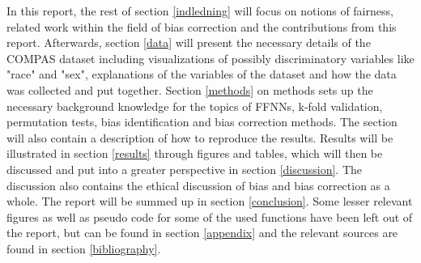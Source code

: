 \documentclass[11pt, fleqn, titlepage]{article}
\begin{document}
	\noindent In this report, the rest of section \ref{indledning} will focus on notions of fairness, related work within the field of bias correction and the contributions from this report. Afterwards, section \ref{data} will present the necessary details of the COMPAS dataset including visualizations of possibly discriminatory variables like "race" and "sex", explanations of the variables of the dataset and how the data was collected and put together. Section \ref{methods} on methods sets up the necessary background knowledge for the topics of FFNNs, k-fold validation, permutation tests, bias identification and bias correction methods. The section will also contain a description of how to reproduce the results. Results will be illustrated in section \ref{results} through figures and tables, which will then be discussed and put into a greater perspective in section \ref{discussion}. The discussion also contains the ethical discussion of bias and bias correction as a whole. The report will be summed up in section \ref{conclusion}. Some lesser relevant figures as well as pseudo code for some of the used functions have been left out of the report, but can be found in section \ref{appendix} and the relevant sources are found in section \ref{bibliography}.
	
\end{document}
